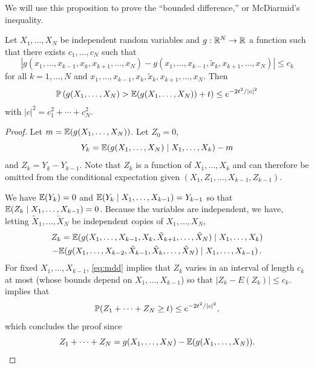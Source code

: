 We will use this proposition to prove the ``bounded difference,'' or McDiarmid's inequality.
\begin{theorem}
\label{th:mdd}
Let $X_1, \ldots, X_N$ be independent random variables and $g: {\mathbb{R}}^N \to {\mathbb{R}}$ a function such that there exists $c_1, \ldots, c_N$ such that
\begin{equation}
\label{eq:mdd}
|g(x_1, \ldots, x_{k-1}, x_k, x_{k+1}, \ldots, x_N) - g(x_1, \ldots, x_{k-1}, \tilde x_k, x_{k+1}, \ldots, x_N)| \leq c_k
\end{equation}
for all $k=1, \ldots, N$ and $x_1, \ldots, x_{k-1}, x_k,\tilde x_k, x_{k+1}, \ldots, x_N$. 
Then
\[
\bm{\mathbb P}\left(g(X_1, \ldots, X_N) > \bm{\mathbb E}(g(X_1, \ldots, X_N))+ t\right) \leq e^{-2t^2/|c|^2}
\]
with $|c|^2 = c_1^2 + \cdots + c_N^2$.
\end{theorem}
\begin{proof}
Let $m = \bm{\mathbb E}(g(X_1, \ldots, X_N))$. Let $Z_0=0$, 
\[
Y_k = \bm{\mathbb E}(g(X_1, \ldots, X_N)\mid X_1, \ldots, X_k) - m
\]
 and $Z_k = Y_k - Y_{k-1}$. Note that $Z_k$ is a function of $X_1, \ldots, X_k$ and can therefore be omitted from the conditional expectation given $(X_1, Z_1, \ldots, X_{k-1}, Z_{k-1})$.
  
We have $\bm{\mathbb E}(Y_k) = 0$ and $\bm{\mathbb E}(Y_k\mid X_1, \ldots, X_{k-1}) = Y_{k-1}$ so that $\bm{\mathbb E}(Z_k\mid X_1, \ldots, X_{k-1}) = 0$. Because the variables are independent,  we have, letting $\tilde X_1, \ldots, \tilde X_N$ be independent copies of $X_1, \ldots, X_N$,
\begin{multline*}
Z_k = \bm{\mathbb E}(g(X_1, \ldots,X_{k-1}, X_k, \tilde X_{k+1}, \ldots,  \tilde X_N)\mid X_1, \ldots, X_k) \\
- \bm{\mathbb E}(g(X_1, \ldots, X_{k-2}, \tilde X_{k-1}, \tilde X_k,\ldots,  \tilde X_N)\mid X_1, \ldots, X_{k-1})\,.
\end{multline*}
For fixed $X_1, \ldots, X_{k-1}$,  \cref{eq:mdd} implies that $Z_k$ varies in an interval of length $c_k$ at most (whose bounds depend on $X_1, \ldots, X_{k-1}$) so that $|Z_k - E(Z_k)| \leq c_k$.   implies that
\[
\bm{\mathbb P}(Z_1+\cdots+Z_N \geq t) \leq  e^{-2t^2/|c|^2},
\]
which concludes the proof since 
\[
Z_1+\cdots+Z_N = g(X_1, \ldots, X_N) - \bm{\mathbb E}(g(X_1, \ldots, X_N)).
\]
\end{proof}

